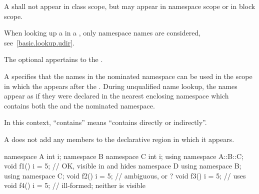 \pnum
A  shall not appear in class scope, but may
appear in namespace scope or in block scope.
\begin{note}
When looking up a  in a
, only namespace names are considered,
see~\ref{basic.lookup.udir}.
\end{note}
The optional  appertains to the .

\pnum
A  specifies that the names in the nominated
namespace can be used in the scope in which the
 appears after the .
During unqualified name lookup, the names
appear as if they were declared in the nearest enclosing namespace which
contains both the  and the nominated
namespace.
\begin{note}
In this context, ``contains'' means ``contains directly or indirectly''.
\end{note}

\pnum
A  does not add any members to the declarative
region in which it appears.
\begin{example}

\begin{codeblock}
namespace A {
  int i;
  namespace B {
    namespace C {
      int i;
    }
    using namespace A::B::C;
    void f1() {
      i = 5;        // OK,  visible in  and hides 
    }
  }
  namespace D {
    using namespace B;
    using namespace C;
    void f2() {
      i = 5;        // ambiguous,  or ?
    }
  }
  void f3() {
    i = 5;          // uses 
  }
}
void f4() {
  i = 5;            // ill-formed; neither  is visible
}
\end{codeblock}
\end{example}

